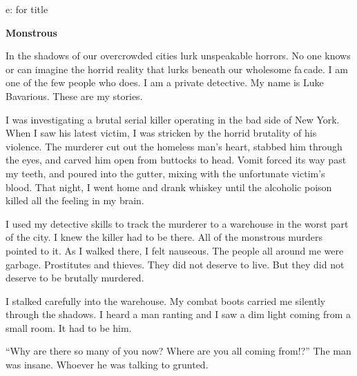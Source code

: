 e: for title 
 




{\bf Monstrous}

%
%
%
%



In the shadows of our overcrowded cities lurk unspeakable horrors.
No one knows or can imagine the horrid reality that lurks beneath
our wholesome fa\,cade. I am one of the few people who does. I
am a private detective. My name is Luke Bavarious. These are my
stories.



I was investigating a brutal serial killer operating in the bad
side of New York. When I saw his latest victim, I was stricken by
the horrid brutality of his violence. The murderer cut out the
homeless man's heart, stabbed him through the eyes, and
carved him open from buttocks to head. Vomit forced its way past my
teeth, and poured into the gutter, mixing with the unfortunate
victim's blood. That night, I went home and drank whiskey
until the alcoholic poison killed all the feeling in my
brain.



I used my detective skills to track the murderer to a warehouse in
the worst part of the city. I knew the killer had to be there. All
of the monstrous murders pointed to it. As I walked there, I felt
nauseous. The people all around me were garbage. Prostitutes and
thieves. They did not deserve to live. But they did not deserve to
be brutally murdered.



I stalked carefully into the warehouse. My combat boots carried me
silently through the shadows. I heard a man ranting and I saw a dim
light coming from a small room. It had to be him.



``Why are there so many of you now? Where are you all coming
from!?'' The man was insane. Whoever he was talking to
grunted.



